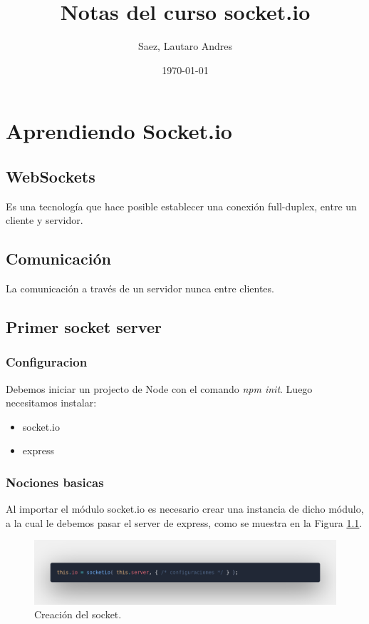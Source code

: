 \documentclass[11pt,a4paper]{book}
\title{Notas del curso socket.io}
\author{Saez, Lautaro Andres}
\date{\today}
\begin{document}
    \maketitle


    \chapter{Aprendiendo Socket.io}

    \section{WebSockets}

    Es una tecnología que hace posible establecer una conexión full-duplex, 
    entre un cliente y servidor.

    \section{Comunicación}

    La comunicación a través de un servidor nunca entre clientes.

    \section{Primer socket server}

    \subsection{Configuracion}

    Debemos iniciar un projecto de Node con el comando \textit{npm init}. Luego 
    necesitamos instalar:

    \begin{itemize}
        \item socket.io 
        \item express
    \end{itemize}

    \subsection{Nociones basicas}

    Al importar el módulo socket.io es necesario crear una instancia de dicho módulo, a la cual le debemos pasar el server de express, como se 
    muestra en la Figura \ref{fig:socket-create}.
    
    \begin{figure}
        \centering
        \includegraphics[width=.8\textwidth]{img/socket-create.png}
        \caption{Creación del socket.}
        \label{fig:socket-create}
    \end{figure}
\end{document}

